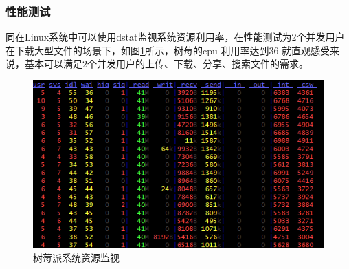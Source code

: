\subsubsection{性能测试}
同在Linux系统中可以使用dstat监视系统资源利用率，在性能测试为2个并发用户在下载大型文件的场景下，如图\ref{dstat}所示，树莓的cpu
利用率达到36%
就直观感受来说，基本可以满足2个并发用户的上传、下载、分享、搜索文件的需求。
\begin{figure}[H]
  \centering
  \includegraphics[width=130mm]{./figures/dstat.png}
  \caption{树莓派系统资源监视}
  \label{dstat}
\end{figure}
\newpage